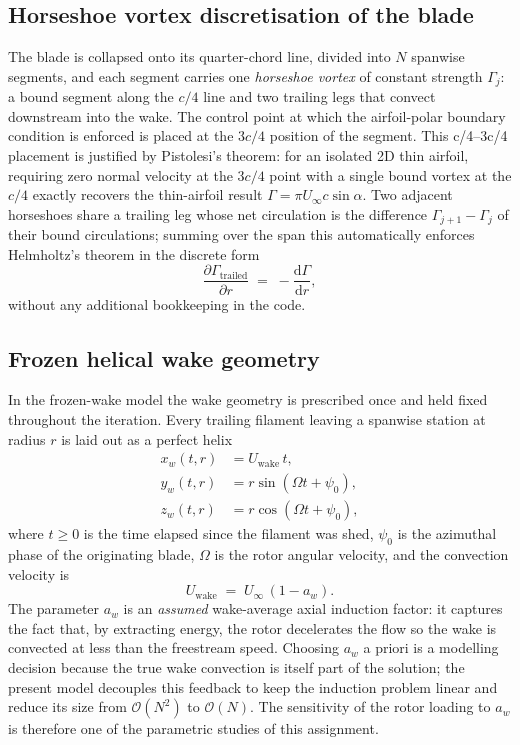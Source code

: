 \subsection{Horseshoe vortex discretisation of the blade}
\label{sec:horseshoe}

The blade is collapsed onto its quarter-chord line, divided into $N$ spanwise segments, and each segment carries one \emph{horseshoe vortex} of constant strength $\Gamma_j$: a bound segment along the $c/4$ line and two trailing legs that convect downstream into the wake. The control point at which the airfoil-polar boundary condition is enforced is placed at the $3c/4$ position of the segment. This c/4--3c/4 placement is justified by Pistolesi's theorem: for an isolated 2D thin airfoil, requiring zero normal velocity at the $3c/4$ point with a single bound vortex at the $c/4$ exactly recovers the thin-airfoil result $\Gamma=\pi U_\infty c\sin\alpha$. Two adjacent horseshoes share a trailing leg whose net circulation is the difference $\Gamma_{j+1}-\Gamma_j$ of their bound circulations; summing over the span this automatically enforces Helmholtz's theorem in the discrete form
\begin{equation}
\frac{\partial \Gamma_{\text{trailed}}}{\partial r} \;=\; -\frac{\mathrm{d}\Gamma}{\mathrm{d}r},
\label{eq:helmholtz-discrete}
\end{equation}
without any additional bookkeeping in the code.

\subsection{Frozen helical wake geometry}
\label{sec:frozen-wake}

In the frozen-wake model the wake geometry is prescribed once and held fixed throughout the iteration. Every trailing filament leaving a spanwise station at radius $r$ is laid out as a perfect helix
\begin{align}
x_w(t,r) &= U_{\text{wake}}\,t, \label{eq:wake-x}\\
y_w(t,r) &= r\sin(\Omega t + \psi_0), \label{eq:wake-y}\\
z_w(t,r) &= r\cos(\Omega t + \psi_0), \label{eq:wake-z}
\end{align}
where $t\geq 0$ is the time elapsed since the filament was shed, $\psi_0$ is the azimuthal phase of the originating blade, $\Omega$ is the rotor angular velocity, and the convection velocity is
\begin{equation}
U_{\text{wake}} \;=\; U_\infty\,(1-a_w).
\label{eq:U-wake}
\end{equation}
The parameter $a_w$ is an \emph{assumed} wake-average axial induction factor: it captures the fact that, by extracting energy, the rotor decelerates the flow so the wake is convected at less than the freestream speed. Choosing $a_w$ a priori is a modelling decision because the true wake convection is itself part of the solution; the present model decouples this feedback to keep the induction problem linear and reduce its size from $\mathcal{O}(N^2)$ to $\mathcal{O}(N)$. The sensitivity of the rotor loading to $a_w$ is therefore one of the parametric studies of this assignment.

